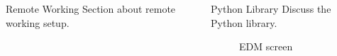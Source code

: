 \documentclass[final,t]{beamer}
\begin{document}
\begin{frame}
\begin{columns}[t]
\begin{column}{.32\linewidth}
      \begin{figure}[t]
          {%
        \setlength{\fboxsep}{0pt}%
        \setlength{\fboxrule}{3pt}%
        }%
      \end{figure}

  \begin{custombox}{Remote Working}
      Section about remote working setup.
  \end{custombox}
  \end{column}



  \begin{column}{.32\linewidth}

  \begin{custombox}{Python Library}
    Discuss the Python library. 
  \end{custombox}
  
      \begin{figure}[t]
          {%
        \setlength{\fboxsep}{0pt}%
        \setlength{\fboxrule}{3pt}%
              \caption{EDM screen}
        }%
\end{figure}


\end{column}
\end{columns}
\end{frame}
\end{document}
